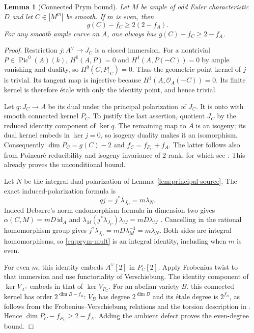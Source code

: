 \documentclass[11pt]{article}
\newtheorem{lemma}[theorem]{Lemma}
\theoremstyle{definition}\newtheorem{definition}[theorem]{Definition}
\theoremstyle{remark}\newtheorem{remark}[theorem]{Remark}
\newcommand{\OO}{\mathcal O}
\newcommand{\Pic}{\operatorname{Pic}}
\begin{document}
\begin{lemma}[Connected Prym bound]\label{lem:prym}
Let $M$ be ample of odd Euler characteristic $D$ and let $C\in|M^m|$ be smooth. If $m$ is even, then
\[
 g(C)-f_C\ge2(2-f_A).
\]
For any smooth ample curve on $A$, one always has $g(C)-f_C\ge2-f_A$.
\end{lemma}
\begin{proof}
Restriction $j:A^\vee\to J_C$ is a closed immersion. For a nontrivial $P\in\Pic^0(A)(k)$, $H^0(A,P)=0$ and $H^1(A,P(-C))=0$ by ample vanishing and duality, so $H^0(C,P|_C)=0$. Thus the geometric point kernel of $j$ is trivial. Its tangent map is injective because $H^1(A,\OO_A(-C))=0$. Its finite kernel is therefore \'etale with only the identity point, and hence trivial.

Let $q:J_C\to A$ be its dual under the principal polarization of $J_C$. It is onto with smooth connected kernel $P_C$. To justify the last assertion, quotient $J_C$ by the reduced identity component of $\ker q$. The remaining map to $A$ is an isogeny; its dual kernel embeds in $\ker j=0$, so isogeny duality makes it an isomorphism. Consequently $\dim P_C=g(C)-2$ and $f_C=f_{P_C}+f_A$. The latter follows also from Poincar\'e reducibility and isogeny invariance of $2$-rank, for which see \citet[Proposition~5.22, pp.~80--81]{EGM}. This already proves the unconditional bound.

Let $N$ be the integral dual polarization of Lemma~\ref{lem:principal-source}. The exact induced-polarization formula is
\begin{equation}\label{eq:prym-mult}
 qj=j^*\lambda_{J_C}=m\lambda_N.
\end{equation}
Indeed Debarre's norm endomorphism formula in dimension two gives $\alpha(C,M)=mD\,\mathrm{id}_A$ and
$\lambda_M(j^*\lambda_{J_C})\lambda_M=mD\lambda_M$
\citep[\S3, equations~(3.2)--(3.3), pp.~346--347]{Debarre}. Cancelling in the rational homomorphism group gives $j^*\lambda_{J_C}=mD\lambda_M^{-1}=m\lambda_N$. Both sides are integral homomorphisms, so \eqref{eq:prym-mult} is an integral identity, including when $m$ is even.

For even $m$, this identity embeds $A^\vee[2]$ in $P_C[2]$. Apply Frobenius twist to that immersion and use functoriality of Verschiebung. The identity component of $\ker V_{A^\vee}$ embeds in that of $\ker V_{P_C}$. For an abelian variety $B$, this connected kernel has order $2^{\dim B-f_B}$: $V_B$ has degree $2^{\dim B}$ and its \'etale degree is $2^{f_B}$, as follows from the Frobenius--Verschiebung relations and the torsion description in \citet[Propositions~5.20--5.22, pp.~80--81]{EGM}. Hence $\dim P_C-f_{P_C}\ge2-f_A$. Adding the ambient defect proves the even-degree bound.
\end{proof}
\end{document}
